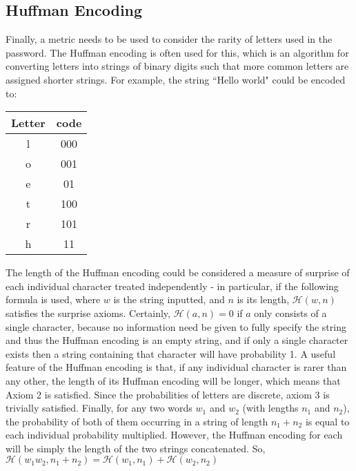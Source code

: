 \documentclass{article}
\begin{document}
\subsection{Huffman Encoding}

Finally, a metric needs to be used to consider the rarity of letters used in the password. The Huffman encoding is often used for this, which is an algorithm for converting letters into strings of binary digits such that more common letters are assigned shorter strings. For example, the string ``Hello world" could be encoded to:

{
\centering
\begin{tabular}{c|c}
    \centering
    Letter & code\\
    \hline
    l & 000 \\
    o & 001 \\
    e & 01 \\
    t & 100 \\
    r & 101 \\
    h & 11
\end{tabular}\par
}

The length of the Huffman encoding could be considered a measure of surprise of each individual character treated independently - in particular, if the following formula is used, where $w$ is the string inputted, and $n$ is its length, $\mathcal{H}(w,n)$ satisfies the surprise axioms. Certainly, $\mathcal{H}(a,n)=0$ if $a$ only consists of a single character, because no information need be given to fully specify the string and thus the Huffman encoding is an empty string, and if only a single character exists then a string containing that character will have probability 1. A useful feature of the Huffman encoding is that, if any individual character is rarer than any other, the length of its Huffman encoding will be longer, which means that Axiom 2 is satisfied. Since the probabilities of letters are discrete, axiom 3 is trivially satisfied. Finally, for any two words $w_1$ and $w_2$ (with lengths $n_1$ and $n_2$), the probability of both of them occurring in a string of length $n_1+n_2$ is equal to each individual probability multiplied. However, the Huffman encoding for each will be simply the length of the two strings concatenated. So, $\mathcal{H}(w_1w_2,n_1+n_2)=\mathcal{H}(w_1,n_1)+\mathcal{H}(w_2,n_2)$
\end{document}

